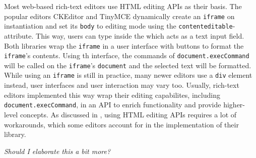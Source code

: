 Most web-based rich-text editors use HTML editing APIs as their basis. The popular editors CKEditor and TinyMCE dynamically create an \texttt{iframe} on instantiation and set its \texttt{body} to editing mode using the \texttt{contenteditable}-attribute. This way, users can type inside the  which acts as a text input field. Both libraries wrap the \texttt{iframe} in a user interface with buttons to format the \texttt{iframe}'s contents. Using th interface, the commands of \texttt{document.execCommand} will be called on the \texttt{iframe}'s \texttt{document} and the selected text will be formatted. While using an \texttt{iframe} is still in practice, many newer editors use a  \texttt{div} element instead, user interfaces and user interaction may vary too.
Usually, rich-text editors implemented this way wrap their editing capabilites, including \texttt{document.execCommand}, in an API to enrich functionality and provide higher-level concepts. As discussed in , using HTML editing APIs requires a lot of workarounds, which some editors account for in the implementation of their library.

\textit{Should I elaborate this a bit more?}
